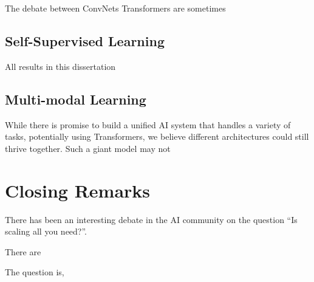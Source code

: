 \documentclass{ucbthesis}
\begin{document}
The debate between ConvNets \vs Transformers are sometimes 

\subsection{Self-Supervised Learning}
All results in this dissertation 

\subsection{Multi-modal Learning}


While there is promise to build a unified AI system that handles a variety of tasks, potentially using Transformers, we believe different architectures could still thrive together. Such a giant model may not 


\section{Closing Remarks}
There has been an interesting debate in the AI community on the question ``Is scaling all you need?''. 

There are 

The question is, 




\printbibliography
\end{document}
